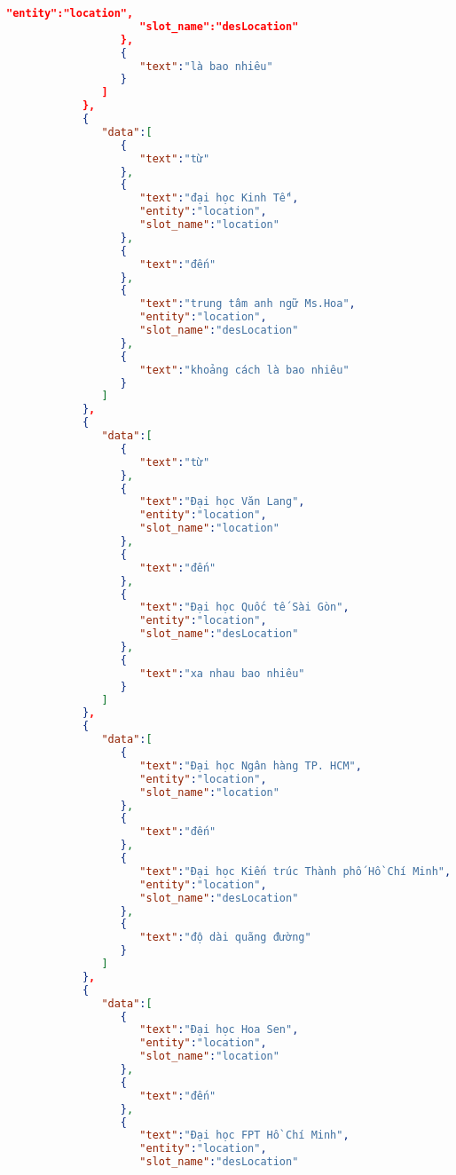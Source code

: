 \begin{lstlisting}[language=json,firstnumber=1]
                     "entity":"location",
                     "slot_name":"desLocation"
                  },
                  {
                     "text":"là bao nhiêu"
                  }
               ]
            },
            {
               "data":[
                  {
                     "text":"từ"
                  },
                  {
                     "text":"đại học Kinh Tế",
                     "entity":"location",
                     "slot_name":"location"
                  },
                  {
                     "text":"đến"
                  },
                  {
                     "text":"trung tâm anh ngữ Ms.Hoa",
                     "entity":"location",
                     "slot_name":"desLocation"
                  },
                  {
                     "text":"khoảng cách là bao nhiêu"
                  }
               ]
            },
            {
               "data":[
                  {
                     "text":"từ"
                  },
                  {
                     "text":"Đại học Văn Lang",
                     "entity":"location",
                     "slot_name":"location"
                  },
                  {
                     "text":"đến"
                  },
                  {
                     "text":"Đại học Quốc tế Sài Gòn",
                     "entity":"location",
                     "slot_name":"desLocation"
                  },
                  {
                     "text":"xa nhau bao nhiêu"
                  }
               ]
            },
            {
               "data":[
                  {
                     "text":"Đại học Ngân hàng TP. HCM",
                     "entity":"location",
                     "slot_name":"location"
                  },
                  {
                     "text":"đến"
                  },
                  {
                     "text":"Đại học Kiến trúc Thành phố Hồ Chí Minh",
                     "entity":"location",
                     "slot_name":"desLocation"
                  },
                  {
                     "text":"độ dài quãng đường"
                  }
               ]
            },
            {
               "data":[
                  {
                     "text":"Đại học Hoa Sen",
                     "entity":"location",
                     "slot_name":"location"
                  },
                  {
                     "text":"đến"
                  },
                  {
                     "text":"Đại học FPT Hồ Chí Minh",
                     "entity":"location",
                     "slot_name":"desLocation"

\end{lstlisting}
